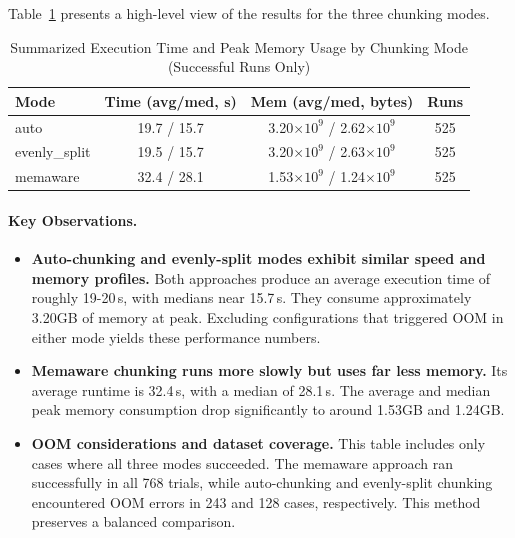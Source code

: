 Table~\ref{tab:mode_summary} presents a high-level view of the results for the three chunking modes.

\begin{table}[ht]
    \centering
    \caption{Summarized Execution Time and Peak Memory Usage by Chunking Mode (Successful Runs Only)}
    \label{tab:mode_summary}
    \begin{tabular}{lccc}
        \toprule
        \textbf{Mode} & \textbf{Time (avg/med, s)} & \textbf{Mem (avg/med, bytes)}             & \textbf{Runs} \\
        \midrule
        auto          & 19.7 / 15.7                & 3.20$\times 10^{9}$ / 2.62$\times 10^{9}$ & 525           \\
        evenly\_split & 19.5 / 15.7                & 3.20$\times 10^{9}$ / 2.63$\times 10^{9}$ & 525           \\
        memaware      & 32.4 / 28.1                & 1.53$\times 10^{9}$ / 1.24$\times 10^{9}$ & 525           \\
        \bottomrule
    \end{tabular}
\end{table}

\paragraph{Key Observations.}
\begin{itemize}

    \item \textbf{Auto-chunking and evenly-split modes exhibit similar speed and memory profiles.}
    Both approaches produce an average execution time of roughly 19-20\,s, with medians near 15.7\,s.
    They consume approximately 3.20\ac{GB} of memory at peak.
    Excluding configurations that triggered \ac{OOM} in either mode yields these performance numbers.

    \item \textbf{Memaware chunking runs more slowly but uses far less memory.}
    Its average runtime is 32.4\,s, with a median of 28.1\,s.
    The average and median peak memory consumption drop significantly to around 1.53\ac{GB} and 1.24\ac{GB}.

    \item \textbf{OOM considerations and dataset coverage.}
    This table includes only cases where all three modes succeeded.
    The memaware approach ran successfully in all 768 trials, while auto-chunking and evenly-split chunking encountered \ac{OOM} errors in 243 and 128 cases, respectively.
    This method preserves a balanced comparison.

\end{itemize}

